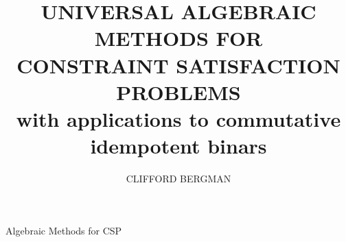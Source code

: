 \usepackage{inputs/macros}
\usepackage{pifont}
\usepackage{bm}
\newcommand\mpar[1]{\mbox{}\marginpar{\raggedright\hspace{0pt}\small #1}}
\newcommand{\towjd}[1]{\par \noindent \mpar{\ding{'120}}{{\bf chb:} \emph{#1}}\par}
\newcommand{\tochb}[1]{\par \noindent \mpar{\ding{'121}}{{\bf wjd:} \emph{#1}}\par}
\let\:\colon
\newcommand{\card}[1]{|#1|}
\DeclareMathOperator{\size}{size}
\newcommand{\sansV}{\ensuremath{\mathsf{V}}}
\newcommand{\Sl}{\ensuremath{Sl}} %
\newcommand{\Sq}[1]{\ensuremath{\mathbf{Sq}_{#1}}}
\newcommand{\sdm}{\sd-\meet\xspace}
\newcommand{\casespec}[1]{\medskip\noindent\textbf{#1}.\enspace}

\usepackage{algorithm}
\usepackage[noend]{algpseudocode}





{Algebraic Methods for CSP}

%
\catchline{}{}{}{}{}
%

\title{UNIVERSAL ALGEBRAIC METHODS FOR\\
CONSTRAINT SATISFACTION PROBLEMS\\
with applications to commutative idempotent binars}

\author{CLIFFORD BERGMAN}
\address{Department of Mathematics, Iowa State University\\Ames, IA 50010, USA\\
}

